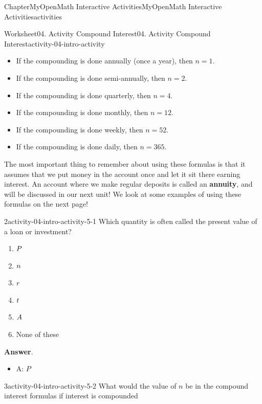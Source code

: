 \documentclass[oneside,10pt,]{book}
\newcommand{\blocktitlefont}{\relax}
\newcommand{\ptxlistdisc}{\raisebox{0.3ex}{\textbullet}}
\newcommand{\terminology}[1]{\textbf{#1}}
\begin{document}
\begin{chapterptx}{Chapter}{MyOpenMath Interactive Activities}{}{MyOpenMath Interactive Activities}{}{}{activities}
\begin{worksheet-section}{Worksheet}{04. Activity Compound Interest}{}{04. Activity Compound Interest}{}{}{activity-04-intro-activity}
\begin{itemize}[label=\ptxlistdisc]
\item{}If the compounding is done annually (once a year), then \(n = 1\).%
\item{}If the compounding is done semi-annually, then \(n = 2\).%
\item{}If the compounding is done quarterly, then \(n = 4\).%
\item{}If the compounding is done monthly, then \(n = 12\).%
\item{}If the compounding is done weekly, then \(n = 52\).%
\item{}If the compounding is done daily, then \(n = 365\).%
\end{itemize}
%
\par
The most important thing to remember about using these formulas is that it assumes that we put money in the account once and let it sit there earning interest. An account where we make regular deposits is called an \terminology{annuity}, and will be discussed in our next unit! We look at some examples of using these formulas on the next page!%
\clearpage
\begin{divisionexercise}{2}{}{}{activity-04-intro-activity-5-1}%
Which quantity is often called the present value of a loan or investment?%
\par
%
\begin{enumerate}[label={(\alph*)}]
\item{}\(\displaystyle \displaystyle{P}\)%
\item{}\(\displaystyle \displaystyle{n}\)%
\item{}\(\displaystyle \displaystyle{r}\)%
\item{}\(\displaystyle \displaystyle{t}\)%
\item{}\(\displaystyle \displaystyle{A}\)%
\item{}None of these%
\end{enumerate}
%
\par\smallskip%
\noindent\textbf{\blocktitlefont Answer}.\hypertarget{activity-04-intro-activity-5-1-2}{}\quad{}%
\begin{itemize}[label=\ptxlistdisc]
\item{}A: \(\displaystyle{P}\)%
\end{itemize}
%
\end{divisionexercise}%
\begin{divisionexercise}{3}{}{}{activity-04-intro-activity-5-2}%
What would the value of \(\displaystyle{n}\) be in the compound interest formulas if interest is compounded%
\par

\end{divisionexercise}
\end{worksheet-section}
\end{chapterptx}
\end{document}
